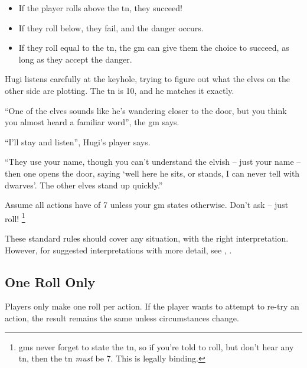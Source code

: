 \begin{multicols}{2}
\begin{multicols}{2}
\begin{itemize}

  \item
  If the player rolls above the \gls{tn}, they succeed!
  \item
  If they roll below, they fail, and the danger occurs.
  \item
  If they roll equal to the \gls{tn}, the \gls{gm} can give them the choice to succeed, as long as they accept the danger.

\end{itemize}

\columnbreak

\noindent
\TNChart

\end{multicols}

\begin{exampletext}
  Hugi listens carefully at the keyhole, trying to figure out what the elves on the other side are plotting.
  The \gls{tn} is 10, and he matches it exactly.

  ``One of the elves sounds like he's wandering closer to the door, but you think you almost heard a familiar word'', the \gls{gm} says.

  ``I'll stay and listen'', Hugi's player says.

  ``They use your name, though you can't understand the elvish -- just your name -- then one opens the door, saying `well here he sits, or stands, I can never tell with dwarves'.
  The other elves stand up quickly.''

\end{exampletext}

Assume all actions have  of 7 unless your \gls{gm} states otherwise.
Don't ask -- just roll!%
\footnote{\Glspl{gm} never forget to state the \gls{tn}, so if you're told to roll, but don't hear any \gls{tn}, then the \gls{tn} \emph{must} be 7.
This is legally binding.}

These standard rules should cover any situation, with the right interpretation.
However, for suggested interpretations with more detail, see , .

\subsection{One Roll Only}

Players only make one roll per action.
If the player wants to attempt to re-try an action, the result remains the same unless circumstances change.


\end{multicols}
